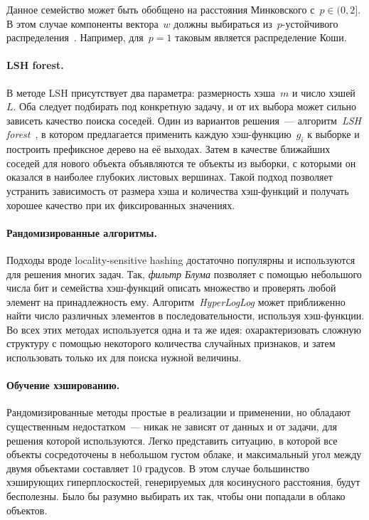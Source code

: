 \documentclass[12pt,fleqn]{article}
\begin{document}
Данное семейство может быть обобщено на расстояния Минковского с~$p \in (0, 2]$.
В этом случае компоненты вектора~$w$ должны выбираться из~$p$-устойчивого распределения~\cite{datar04pstable}.
Например, для~$p = 1$ таковым является распределение Коши.

\paragraph{LSH forest.}
В методе LSH присутствует два параметра: размерность хэша~$m$ и число хэшей~$L$.
Оба следует подбирать под конкретную задачу, и от их выбора может сильно
зависеть качество поиска соседей.
Один из вариантов решения~--- алгоритм~\emph{LSH forest}~\cite{bawa05lshforest},
в котором предлагается применить каждую хэш-функцию~$g_i$ к выборке
и построить префиксное дерево на её выходах.
Затем в качестве ближайших соседей для нового объекта объявляются те объекты из выборки,
с которыми он оказался в наиболее глубоких листовых вершинах.
Такой подход позволяет устранить зависимость от размера хэша и количества хэш-функций
и получать хорошее качество при их фиксированных значениях.

\paragraph{Рандомизированные алгоритмы.}
Подходы вроде locality-sensitive hashing достаточно популярны и используются для решения многих задач.
Так, \emph{фильтр Блума} позволяет с помощью небольшого числа бит и семейства хэш-функций
описать множество и проверять любой элемент на принадлежность ему.
Алгоритм~\emph{HyperLogLog} может приближенно найти число различных элементов в последовательности,
используя хэш-функции.
Во всех этих методах используется одна и та же идея: охарактеризовать сложную структуру с помощью некоторого количества
случайных признаков, и затем использовать только их для поиска нужной величины.

\paragraph{Обучение хэшированию.}
Рандомизированные методы простые в реализации и применении, но обладают существенным недостатком~---
никак не зависят от данных и от задачи, для решения которой используются.
Легко представить ситуацию, в которой все объекты сосредоточены в небольшом густом облаке,
и максимальный угол между двумя объектами составляет 10 градусов.
В этом случае большинство хэширующих гиперплоскостей, генерируемых для косинусного расстояния,
будут бесполезны.
Было бы разумно выбирать их так, чтобы они попадали в облако объектов.
\end{document}

